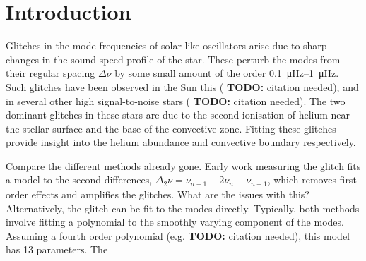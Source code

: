 \documentclass[linenumbers,modern]{aastex631dm}
\newcommand{\todo}[1]{{\color{todo} \textbf{TODO:} #1}}
\newcommand{\needcite}{\todo{citation needed}}
\begin{document}

\section{Introduction}\label{sec:intro}

Glitches in the mode frequencies of solar-like oscillators arise due to sharp
changes in the sound-speed profile of the star. These perturb the modes from
their regular spacing \(\Delta\nu\) by some small amount of the order
\SIrange{0.1}{1}{\micro\Hz}. Such glitches have been observed in the Sun this (\needcite),
and in several other high signal-to-noise stars (\needcite). The two dominant
glitches in these stars are due to the second ionisation of helium near the
stellar surface and the base of the convective zone. Fitting these
glitches provide insight into the helium abundance and convective boundary
respectively.

Compare the different methods already gone. Early work measuring the glitch
fits a model to the second differences,
\(\Delta_2\nu = \nu_{n-1} - 2\nu_n + \nu_{n+1}\),
which removes first-order effects and amplifies the glitches. What are the
issues with this? Alternatively,
the glitch can be fit to the modes directly. Typically, both methods involve
fitting a polynomial to the smoothly varying component of the modes. Assuming
a fourth order polynomial (e.g. \needcite), this model has 13 parameters. The
\end{document}
